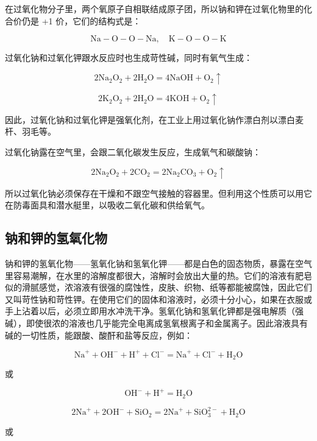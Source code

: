 在过氧化物分子里，两个氧原子自相联结成原子团，所以钠和钾在过氧化物里的化合价仍是
+1 价，它们的结构式是：

\[
\mathrm{Na} - \mathrm{O} - \mathrm{O} - \mathrm{Na}, \quad \mathrm{K} - \mathrm{O} - \mathrm{O} - \mathrm{K}
\]

过氧化钠和过氧化钾跟水反应时也生成苛性碱，同时有氧气生成：

\[
2 \mathrm{Na} _ {2} \mathrm{O} _ {2} + 2 \mathrm{H} _ {2} \mathrm{O} = 4 \mathrm{NaOH} + \mathrm{O} _ {2} \uparrow
\]

\[
2 \mathrm{K} _ {2} \mathrm{O} _ {2} + 2 \mathrm{H} _ {2} \mathrm{O} = 4 \mathrm{KOH} + \mathrm{O} _ {2} \uparrow
\]

因此，过氧化钠和过氧化钾是强氧化剂，在工业上用过氧化钠作漂白剂以漂白麦杆、羽毛等。

过氧化钠露在空气里，会跟二氧化碳发生反应，生成氧气和碳酸钠：

\[
2 \mathrm{Na} _ {2} \mathrm{O} _ {2} + 2 \mathrm{CO} _ {2} = 2 \mathrm{Na} _ {2} \mathrm{CO} _ {3} + \mathrm{O} _ {2} \uparrow
\]

所以过氧化钠必须保存在干燥和不跟空气接触的容器里。但利用这个性质可以用它在防毒面具和潜水艇里，以吸收二氧化碳和供给氧气。

\subsection{钠和钾的氢氧化物}

钠和钾的氢氧化物------氢氧化钠和氢氧化钾------都是白色的固态物质，暴露在空气里容易潮解，在水里的溶解度都很大，溶解时会放出大量的热。它们的溶液有肥皂似的滑腻感觉，浓溶液有很强的腐蚀性，皮肤、织物、纸等都能被腐蚀，因此它们又叫苛性钠和苛性钾。在使用它们的固体和溶液时，必须十分小心，如果在衣服或手上沾着以后，必须立即用水冲洗干净。氢氧化钠和氢氧化钾都是强电解质（强碱），即使很浓的溶液也几乎能完全电离成氢氧根离子和金属离子。因此溶液具有碱的一切性质，能跟酸、酸酐和盐等反应，例如：

\[
\mathrm{Na} ^ {+} + \mathrm{OH} ^ {-} + \mathrm{H} ^ {+} + \mathrm{Cl} ^ {-} = \mathrm{Na} ^ {+} + \mathrm{Cl} ^ {-} + \mathrm{H} _ {2} \mathrm{O}
\]

或

\[
\mathrm{OH} ^ {-} + \mathrm{H} ^ {+} = \mathrm{H} _ {2} \mathrm{O}
\]

\[
2 \mathrm{Na} ^ {+} + 2 \mathrm{OH} ^ {-} + \mathrm{SiO} _ {2} = 2 \mathrm{Na} ^ {+} + \mathrm{SiO} _ {3}^{2-} + \mathrm{H} _ {2} \mathrm{O}
\]

或

